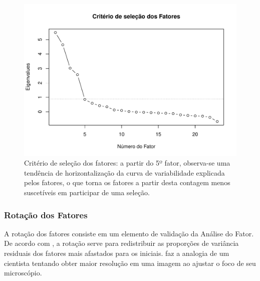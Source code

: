\begin{figure}[H]
		\centering
		\includegraphics[scale=.75]{../../graficos/latex-graph-fa-scree-plot.pdf}
		\caption{Critério de seleção dos fatores: a partir do 5º fator, observa-se uma tendência de horizontalização da curva de variabilidade explicada pelos fatores, o que torna os fatores a partir desta contagem menos suscetíveis em participar de uma seleção.}
		\label{fig: fa-scree-plot}
\end{figure}

\subsubsection{Rotação dos Fatores}

A rotação dos fatores consiste em um elemento de validação da Análise do Fator. De acordo com , a rotação serve para redistribuir as proporções de variância residuais dos fatores mais afastados para os iniciais.  faz a analogia de um cientista tentando obter maior resolução em uma imagem ao ajustar o foco de seu microscópio.

